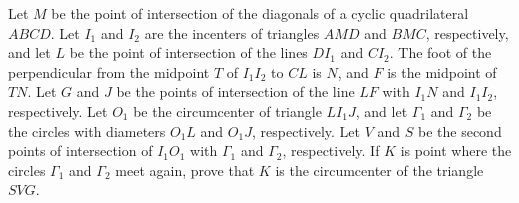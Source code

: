 Let $M$ be the point of intersection of the diagonals of a cyclic quadrilateral $ABCD$. Let $I_1$ and $I_2$ are the incenters of triangles $AMD$ and $BMC$, respectively, and let $L$ be the point of intersection of the lines $DI_1$ and $CI_2$. The foot of the perpendicular from the midpoint $T$ of $I_1I_2$ to $CL$ is $N$, and $F$ is the midpoint of $TN$. Let $G$ and $J$ be the points of intersection of the line $LF$ with $I_1N$ and $I_1I_2$, respectively. Let $O_1$ be the circumcenter of triangle $LI_1J$, and let $\Gamma_1$ and $\Gamma_2$ be the circles with diameters $O_1L$ and $O_1J$, respectively. Let $V$ and $S$ be the second points of intersection of $I_1O_1$ with $\Gamma_1$ and $\Gamma_2$, respectively. If $K$ is point where the circles $\Gamma_1$ and $\Gamma_2$ meet again, prove that $K$ is the circumcenter of the triangle $SVG$.